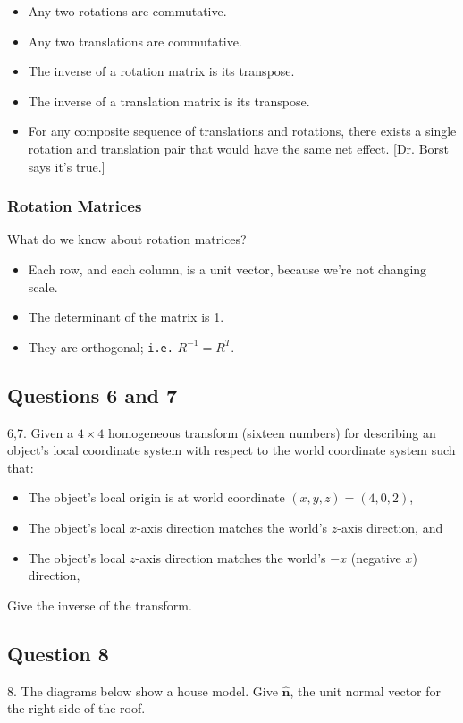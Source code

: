 \documentclass[11pt]{article}
\begin{document}
\begin{spacing}{1.2}
\begin{itemize}
	\item Any two rotations are commutative.
	\item Any two translations are commutative.
	\item The inverse of a rotation matrix is its transpose.  
	\item The inverse of a translation matrix is its transpose.  
	\item For any composite sequence of translations and rotations, there exists a single rotation and translation pair that would have the same net effect.  [Dr. Borst says it's true.]
\end{itemize}

\subsubsection{Rotation Matrices}

What do we know about rotation matrices?

\begin{itemize}
	\item Each row, and each column, is a unit vector, because we're not changing scale.
	\item The determinant of the matrix is 1.
	\item They are orthogonal; {\tt i.e.} $R^{-1} = R^T$.
\end{itemize}

\subsection{Questions 6 and 7}
6,7.  Given a $4 \times 4$ homogeneous transform (sixteen numbers) for describing an object's local coordinate system with respect to the world coordinate system such that:

\begin{itemize}
	\item The object's local origin is at world coordinate $(x,y,z) = (4,0,2)$,
	\item The object's local $x$-axis direction matches the world's $z$-axis direction, and 
	\item The object's local $z$-axis direction matches the world's $-x$ (negative $x$) direction, 
\end{itemize}

Give the inverse of the transform.  

\subsection{Question 8}
8.  The diagrams below show a house model.  Give $\hat{\mathbf{n}}$, the unit normal vector for the right side of the roof.  


\end{spacing}
\end{document}
